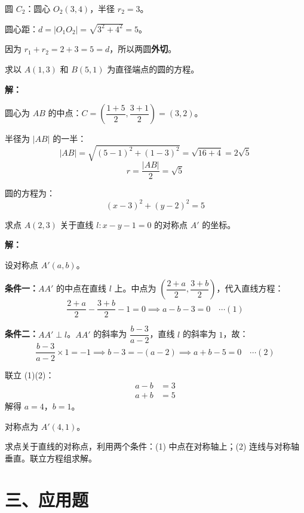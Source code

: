 \documentclass[12pt, a4paper]{ctexart}
\begin{document}
圆 $C_2$：圆心 $O_2(3, 4)$，半径 $r_2 = 3$。

圆心距：$d = |O_1O_2| = \sqrt{3^2 + 4^2} = 5$。

因为 $r_1 + r_2 = 2 + 3 = 5 = d$，所以两圆\textbf{外切}。

\bigskip

\begin{examplebox}
求以 $A(1, 3)$ 和 $B(5, 1)$ 为直径端点的圆的方程。
\end{examplebox}

\textbf{解：}

圆心为 $AB$ 的中点：$C = \left(\dfrac{1+5}{2}, \dfrac{3+1}{2}\right) = (3, 2)$。

半径为 $|AB|$ 的一半：
\[
|AB| = \sqrt{(5-1)^2 + (1-3)^2} = \sqrt{16 + 4} = 2\sqrt{5}
\]
\[
r = \frac{|AB|}{2} = \sqrt{5}
\]

圆的方程为：
\[
\boxed{(x - 3)^2 + (y - 2)^2 = 5}
\]

\bigskip

\begin{examplebox}[【例题10】对称问题]
求点 $A(2, 3)$ 关于直线 $l: x - y - 1 = 0$ 的对称点 $A'$ 的坐标。
\end{examplebox}

\textbf{解：}

设对称点 $A'(a, b)$。

\textbf{条件一：}$AA'$ 的中点在直线 $l$ 上。中点为 $\left(\dfrac{2+a}{2}, \dfrac{3+b}{2}\right)$，代入直线方程：
\[
\frac{2+a}{2} - \frac{3+b}{2} - 1 = 0 \implies a - b - 3 = 0 \quad \cdots (1)
\]

\textbf{条件二：}$AA' \perp l$。$AA'$ 的斜率为 $\dfrac{b - 3}{a - 2}$，直线 $l$ 的斜率为 $1$，故：
\[
\frac{b - 3}{a - 2} \times 1 = -1 \implies b - 3 = -(a - 2) \implies a + b - 5 = 0 \quad \cdots (2)
\]

联立 (1)(2)：
\begin{align*}
a - b &= 3 \\
a + b &= 5
\end{align*}
解得 $a = 4$，$b = 1$。

对称点为 $\boxed{A'(4, 1)}$。

\begin{tipbox}[方法总结]
求点关于直线的对称点，利用两个条件：(1) 中点在对称轴上；(2) 连线与对称轴垂直。联立方程组求解。
\end{tipbox}

\section*{\textcolor{apppurple}{三、应用题}}
\end{document}
